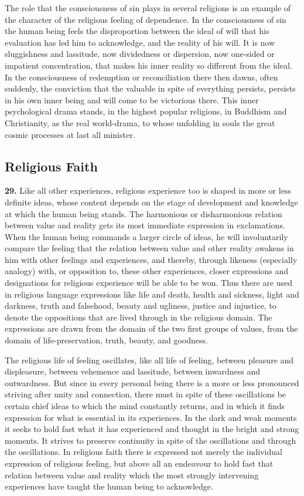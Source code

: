 \documentclass[12pt,a4paper]{book}
\newcommand{\opage}[1]{\marginnote{\footnotesize\textit{[#1]}}}
\begin{document}
The role that the consciousness of sin plays in several religions is an example of
the character of the religious feeling of dependence. In the consciousness of sin
the human being feels the disproportion between the ideal of will that his
evaluation has led him to acknowledge, and the reality of his will. It is now
sluggishness and lassitude, now dividedness or dispersion, now one-sided or
impatient concentration, that makes his inner reality so different from the ideal.
In the consciousness of redemption or reconciliation there then dawns, often
suddenly, the conviction that the valuable in spite of everything persists,
persists in his own inner being and will come to be victorious there. This inner
psychological drama stands, in the highest popular religions, in Buddhism and
Christianity, as the real world-drama, to whose unfolding in souls the great
cosmic processes at last all minister.

\subsection{Religious Faith}
\label{ssec:faith}

\noindent\textbf{29.} Like all other experiences, religious experience too is
shaped in more or less definite ideas, whose content depends on the stage of
development and knowledge at which the human being stands. The harmonious or
disharmonious relation between value and reality gets its most immediate
expression in exclamations. When the human being commands a larger circle of
ideas, he will involuntarily compare the feeling that the relation between
value and other reality awakens in him with other feelings and experiences, and
thereby, through likeness (especially analogy) with, or opposition to, these
other experiences, closer expressions and designations for religious experience
will be able to be won. Thus there are used in religious language expressions
like life and 
\opage{70}death, health and sickness, light and darkness, truth and
falsehood, beauty and ugliness, justice and injustice, to denote the
oppositions that are lived through in the religious domain. The expressions are
drawn from the domain of the two first groups of values, from the domain of
life-preservation, truth, beauty, and goodness.

The religious life of feeling oscillates, like all life of feeling, between
pleasure and displeasure, between vehemence and lassitude, between inwardness
and outwardness. But since in every personal being there is a more or less
pronounced striving after unity and connection, there must in spite of these
oscillations be certain chief ideas to which the mind constantly returns, and in
which it finds expression for what is essential in its experiences. In the dark
and weak moments it seeks to hold fast what it has experienced and thought in
the bright and strong moments. It strives to preserve continuity in spite of the
oscillations and through the oscillations. In religious faith there is expressed
not merely the individual expression of religious feeling, but above all an
endeavour to hold fast that relation between value and reality which the most
strongly intervening experiences have taught the human being to acknowledge.
\end{document}
